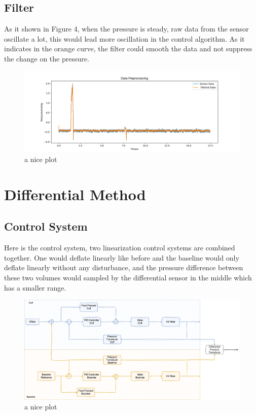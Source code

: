 \subsection{Filter}
 As it shown in Figure 4, when the pressure is steady, raw data from the sensor oscillate a lot, this would lead more oscillation in the control algorithm. As it indicates in the orange curve, the filter could smooth the data and not suppress the change on the pressure.

 \begin{figure}[h]
    \centering 
    \captionsetup{justification=centering}
    \includegraphics[width=\textwidth]{img/datapreprocessing.png}
    \caption{a nice plot}
    \label{fig:mesh1}
\end{figure}


\section{Differential Method}
\subsection{Control System}
Here is the control system, two linearization control systems are combined together. One would deflate linearly like before and the baseline would only deflate linearly without any disturbance, and the pressure difference between these two volumes would sampled by the differential sensor in the middle which has a smaller range.

\begin{figure}[h]
    \centering 
    \captionsetup{justification=centering}
    \includegraphics[width=\textwidth]{img/cs_diff.png}
    \caption{a nice plot}
    \label{fig:mesh1}
\end{figure}

